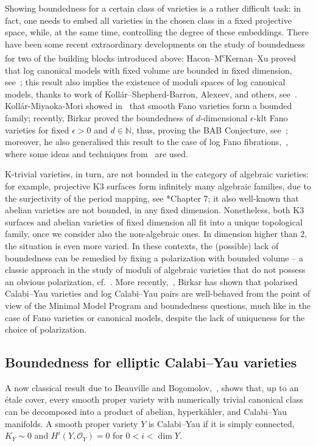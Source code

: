\documentclass[11pt]{ip-journal}
\theoremstyle{definition}
\begin{document}
Showing boundedness for a certain class of varieties is a rather difficult task: in fact, one needs to embed all varieties in the chosen class in a fixed projective space, while, at the same time, controlling the degree of these embeddings. 
There have been some recent extraordinary developments on the study of boundedness for two of the building blocks introduced above:
Hacon--M\textsuperscript{c}Kernan--Xu proved that log canonical models with fixed volume are bounded in fixed dimension, see~\cite{MR3779687}; 
this result also implies the existence of moduli spaces of log canonical models, thanks to work of Koll\'ar--Shepherd-Barron, Alexeev, and others, see~\cite{MR3184176}.
Koll\'ar-Miyaoka-Mori showed in~\cite{MR1189503} that smooth Fano varieties form a bounded family; recently, Birkar proved the boundedness of $d$-dimensional $\epsilon$-klt Fano varieties for fixed $\epsilon >0$ and $d \in \mathbb{N}$, thus, proving the BAB Conjecture, see~\cite{Bir16b}; 
moreover, he also generalised this result to the case of log Fano fibrations,~\cites{1811.10709, 1811.107092}, where some ideas and techniques from~\cites{MR3862064, DCS} are used.

K-trivial varieties, in turn, are not bounded in the category of algebraic varieties: 
for example, projective K3 surfaces form infinitely many algebraic families, due to the surjectivity of the period mapping, see \cite{Huyb_K3}*{Chapter 7}; 
it also well-known that abelian varieties are not bounded, in any fixed dimension. 
Nonetheless, both K3 surfaces and abelian varieties of fixed dimension all fit into a unique topological family, once we consider also the non-algebraic ones. 
In dimension higher than 2, the situation is even more varied. 
In these contexts, the (possible) lack of boundedness can be remedied by fixing a polarization with bounded volume -- a classic approach in the study of moduli of algebraic varieties that do not possess an obvious polarization, cf.~\cite{MR1368632}.
More recently,~\cite{2006.11238}, Birkar has shown that polarised Calabi--Yau varieties and log Calabi--Yau pairs are well-behaved from the point of view of the Minimal Model Program and boundedness questions, much like in the case of Fano varieties or canonical models, despite the lack of uniqueness for the choice of polarization.

\subsection*{Boundedness for elliptic Calabi--Yau varieties} 
A now classical result due to Beauville and Bogomolov,~\cite{MR730926}, shows that, up to an \'etale cover, every smooth proper variety with numerically trivial canonical class can be decomposed into a product of abelian, hyperk\"ahler, and Calabi--Yau manifolds. 
A smooth proper variety $Y$ is Calabi--Yau if it is simply connected, $K_Y \sim 0$ and $H^i(Y, \mathcal{O}_Y)=0$ for $0<i<\dim Y$.
\end{document}

